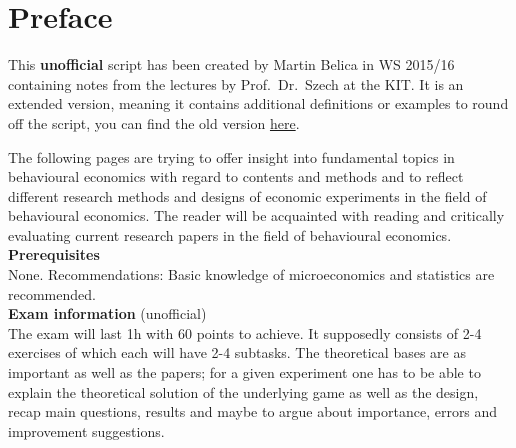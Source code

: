 

\chapter*{Preface}
This \textbf{unofficial} script has been created by Martin Belica in WS 2015/16 containing notes from the lectures by Prof.~Dr.~Szech at the KIT. It is an extended version, meaning it contains additional definitions or examples to round off the script, you can find the old version \href{goo.gl/EOC2Kh}{here}.

The following pages are trying to offer insight into fundamental topics in behavioural economics with regard to contents and methods and to reflect different research methods and designs of economic experiments in the field of behavioural economics. The reader will be acquainted with reading and critically evaluating current research papers in the field of behavioural economics. \\

\textbf{Prerequisites} \\
None. Recommendations: Basic knowledge of microeconomics and statistics are recommended. \\

\textbf{Exam information} (unofficial) \\
The exam will last 1h with 60 points to achieve. It supposedly consists of 2-4 exercises of which each will have 2-4 subtasks. The theoretical bases are as important as well as the papers; for a given experiment one has to be able to explain the theoretical solution of the underlying game as well as the design, recap main questions, results and maybe to argue about importance, errors and improvement suggestions.